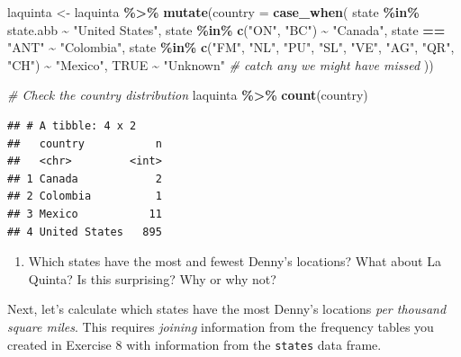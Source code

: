 \documentclass[
]{article}
\newenvironment{Shaded}{\begin{snugshade}}{\end{snugshade}}
\newcommand{\AttributeTok}[1]{\textcolor[rgb]{0.13,0.29,0.53}{#1}}
\newcommand{\CommentTok}[1]{\textcolor[rgb]{0.56,0.35,0.01}{\textit{#1}}}
\newcommand{\ConstantTok}[1]{\textcolor[rgb]{0.56,0.35,0.01}{#1}}
\newcommand{\FunctionTok}[1]{\textcolor[rgb]{0.13,0.29,0.53}{\textbf{#1}}}
\newcommand{\NormalTok}[1]{#1}
\newcommand{\OtherTok}[1]{\textcolor[rgb]{0.56,0.35,0.01}{#1}}
\newcommand{\SpecialCharTok}[1]{\textcolor[rgb]{0.81,0.36,0.00}{\textbf{#1}}}
\newcommand{\StringTok}[1]{\textcolor[rgb]{0.31,0.60,0.02}{#1}}
\providecommand{\tightlist}{%
  \setlength{\itemsep}{0pt}\setlength{\parskip}{0pt}}
\begin{document}
\begin{Shaded}
\begin{Highlighting}[]
\NormalTok{laquinta }\OtherTok{\textless{}{-}}\NormalTok{ laquinta }\SpecialCharTok{\%\textgreater{}\%}
  \FunctionTok{mutate}\NormalTok{(}\AttributeTok{country =} \FunctionTok{case\_when}\NormalTok{(}
\NormalTok{    state }\SpecialCharTok{\%in\%}\NormalTok{ state.abb     }\SpecialCharTok{\textasciitilde{}} \StringTok{"United States"}\NormalTok{,}
\NormalTok{    state }\SpecialCharTok{\%in\%} \FunctionTok{c}\NormalTok{(}\StringTok{"ON"}\NormalTok{, }\StringTok{"BC"}\NormalTok{) }\SpecialCharTok{\textasciitilde{}} \StringTok{"Canada"}\NormalTok{,}
\NormalTok{    state }\SpecialCharTok{==} \StringTok{"ANT"}           \SpecialCharTok{\textasciitilde{}} \StringTok{"Colombia"}\NormalTok{,}
\NormalTok{    state }\SpecialCharTok{\%in\%} \FunctionTok{c}\NormalTok{(}\StringTok{"FM"}\NormalTok{, }\StringTok{"NL"}\NormalTok{, }\StringTok{"PU"}\NormalTok{, }\StringTok{"SL"}\NormalTok{, }\StringTok{"VE"}\NormalTok{, }\StringTok{"AG"}\NormalTok{, }\StringTok{"QR"}\NormalTok{, }\StringTok{"CH"}\NormalTok{) }\SpecialCharTok{\textasciitilde{}} \StringTok{"Mexico"}\NormalTok{,}
    \ConstantTok{TRUE}                     \SpecialCharTok{\textasciitilde{}} \StringTok{"Unknown"}  \CommentTok{\# catch any we might have missed}
\NormalTok{  ))}

\CommentTok{\# Check the country distribution}
\NormalTok{laquinta }\SpecialCharTok{\%\textgreater{}\%}
  \FunctionTok{count}\NormalTok{(country)}
\end{Highlighting}
\end{Shaded}

\begin{verbatim}
## # A tibble: 4 x 2
##   country           n
##   <chr>         <int>
## 1 Canada            2
## 2 Colombia          1
## 3 Mexico           11
## 4 United States   895
\end{verbatim}

\begin{enumerate}
\def\labelenumi{\arabic{enumi}.}
\setcounter{enumi}{8}
\tightlist
\item
  Which states have the most and fewest Denny's locations? What about La
  Quinta? Is this surprising? Why or why not?
\end{enumerate}

Next, let's calculate which states have the most Denny's locations
\emph{per thousand square miles}. This requires \emph{joining}
information from the frequency tables you created in Exercise 8 with
information from the \texttt{states} data frame.
\end{document}
